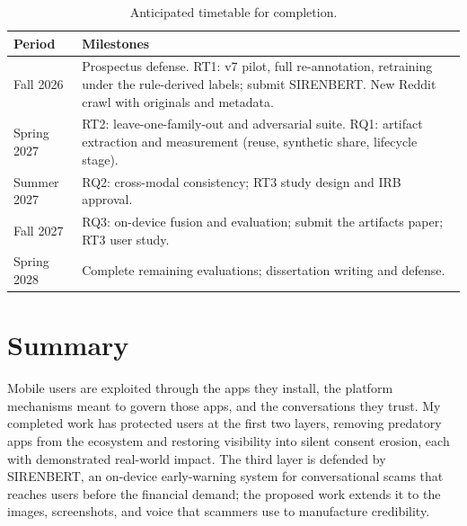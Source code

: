 \documentclass[letterpaper,11pt]{article}
\begin{document}
\begin{table}[h]
\centering
\small
\begin{tabular}{p{1.4in}p{4.6in}}
\toprule
\textbf{Period} & \textbf{Milestones} \\
\midrule
Fall 2026 & Prospectus defense. RT1: v7 pilot, full re-annotation, retraining under the
rule-derived labels; submit SIRENBERT. New Reddit crawl with originals and metadata. \\
Spring 2027 & RT2: leave-one-family-out and adversarial suite. RQ1: artifact
extraction and measurement (reuse, synthetic share, lifecycle stage). \\
Summer 2027 & RQ2: cross-modal consistency; RT3 study design and IRB approval. \\
Fall 2027 & RQ3: on-device fusion and evaluation; submit the artifacts paper; RT3 user study. \\
Spring 2028 & Complete remaining evaluations; dissertation writing and defense. \\
\bottomrule
\end{tabular}
\caption{Anticipated timetable for completion.}
\end{table}

\section{Summary}

Mobile users are exploited through the apps they install, the platform
mechanisms meant to govern those apps, and the conversations they
trust. My completed work has protected users at the first two layers,
removing predatory apps from the ecosystem and restoring visibility
into silent consent erosion, each with demonstrated real-world impact.
The third layer is defended by SIRENBERT, an on-device early-warning
system for conversational scams that reaches users before the financial
demand; the proposed work extends it to the images, screenshots, and
voice that scammers use to manufacture credibility.

{\footnotesize

}

\end{document}
